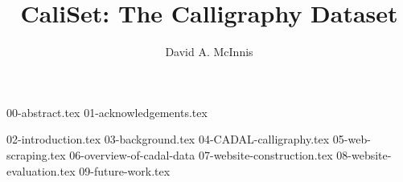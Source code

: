 \documentclass{ewuthesis}
\begin{document}
    \title{CaliSet: The Calligraphy Dataset}
    \author{David A. McInnis}    
    
    
    
    
    \frontmatter
    \maketitle
    \makesigpage
    \makelibrarystatement{}
    {00-abstract.tex}
    {01-acknowledgements.tex}
    \mainmatter
    \tableofcontents
    \listoffigures{}
    {02-introduction.tex}
    {03-background.tex}
    {04-CADAL-calligraphy.tex}
    {05-web-scraping.tex}
    {06-overview-of-cadal-data}
    {07-website-construction.tex}
    {08-website-evaluation.tex}
    {09-future-work.tex}
    \backmatter{}
    
    



    
    \makevita
    
    
\end{document}
